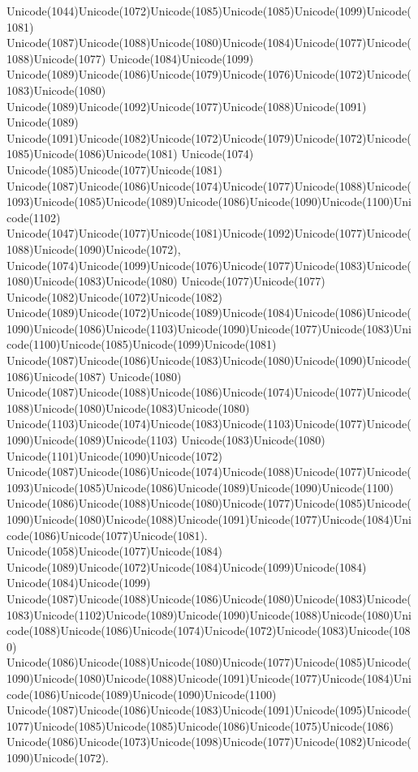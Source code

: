 \documentclass[a4paper,11pt]{report}
\begin{document}
{{{\begin{Verbatim}[commandchars=!@|,fontsize=\small,frame=single,label=Пример]
\end{Verbatim}
 Unicode(1044)Unicode(1072)Unicode(1085)Unicode(1085)Unicode(1099)Unicode(1081)
Unicode(1087)Unicode(1088)Unicode(1080)Unicode(1084)Unicode(1077)Unicode(1088)Unicode(1077)
Unicode(1084)Unicode(1099)
Unicode(1089)Unicode(1086)Unicode(1079)Unicode(1076)Unicode(1072)Unicode(1083)Unicode(1080)
Unicode(1089)Unicode(1092)Unicode(1077)Unicode(1088)Unicode(1091)
Unicode(1089)
Unicode(1091)Unicode(1082)Unicode(1072)Unicode(1079)Unicode(1072)Unicode(1085)Unicode(1086)Unicode(1081)
Unicode(1074) Unicode(1085)Unicode(1077)Unicode(1081)
Unicode(1087)Unicode(1086)Unicode(1074)Unicode(1077)Unicode(1088)Unicode(1093)Unicode(1085)Unicode(1089)Unicode(1086)Unicode(1090)Unicode(1100)Unicode(1102)
Unicode(1047)Unicode(1077)Unicode(1081)Unicode(1092)Unicode(1077)Unicode(1088)Unicode(1090)Unicode(1072),
Unicode(1074)Unicode(1099)Unicode(1076)Unicode(1077)Unicode(1083)Unicode(1080)Unicode(1083)Unicode(1080)
Unicode(1077)Unicode(1077) Unicode(1082)Unicode(1072)Unicode(1082)
Unicode(1089)Unicode(1072)Unicode(1089)Unicode(1084)Unicode(1086)Unicode(1090)Unicode(1086)Unicode(1103)Unicode(1090)Unicode(1077)Unicode(1083)Unicode(1100)Unicode(1085)Unicode(1099)Unicode(1081)
Unicode(1087)Unicode(1086)Unicode(1083)Unicode(1080)Unicode(1090)Unicode(1086)Unicode(1087)
Unicode(1080)
Unicode(1087)Unicode(1088)Unicode(1086)Unicode(1074)Unicode(1077)Unicode(1088)Unicode(1080)Unicode(1083)Unicode(1080)
Unicode(1103)Unicode(1074)Unicode(1083)Unicode(1103)Unicode(1077)Unicode(1090)Unicode(1089)Unicode(1103)
Unicode(1083)Unicode(1080) Unicode(1101)Unicode(1090)Unicode(1072)
Unicode(1087)Unicode(1086)Unicode(1074)Unicode(1088)Unicode(1077)Unicode(1093)Unicode(1085)Unicode(1086)Unicode(1089)Unicode(1090)Unicode(1100)
Unicode(1086)Unicode(1088)Unicode(1080)Unicode(1077)Unicode(1085)Unicode(1090)Unicode(1080)Unicode(1088)Unicode(1091)Unicode(1077)Unicode(1084)Unicode(1086)Unicode(1077)Unicode(1081).
Unicode(1058)Unicode(1077)Unicode(1084)
Unicode(1089)Unicode(1072)Unicode(1084)Unicode(1099)Unicode(1084)
Unicode(1084)Unicode(1099)
Unicode(1087)Unicode(1088)Unicode(1086)Unicode(1080)Unicode(1083)Unicode(1083)Unicode(1102)Unicode(1089)Unicode(1090)Unicode(1088)Unicode(1080)Unicode(1088)Unicode(1086)Unicode(1074)Unicode(1072)Unicode(1083)Unicode(1080)
Unicode(1086)Unicode(1088)Unicode(1080)Unicode(1077)Unicode(1085)Unicode(1090)Unicode(1080)Unicode(1088)Unicode(1091)Unicode(1077)Unicode(1084)Unicode(1086)Unicode(1089)Unicode(1090)Unicode(1100)
Unicode(1087)Unicode(1086)Unicode(1083)Unicode(1091)Unicode(1095)Unicode(1077)Unicode(1085)Unicode(1085)Unicode(1086)Unicode(1075)Unicode(1086)
Unicode(1086)Unicode(1073)Unicode(1098)Unicode(1077)Unicode(1082)Unicode(1090)Unicode(1072). }

}}
\end{document}
